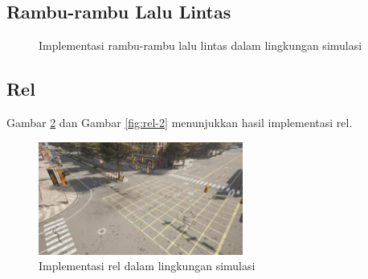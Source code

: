 \subsection{Rambu-rambu Lalu Lintas}

\begin{figure}[!h]
	\centering
	\hfill
	\caption{Implementasi rambu-rambu lalu lintas dalam lingkungan simulasi}
	\label{fig:road-signs}
\end{figure}

\subsection{Rel}

Gambar \ref{fig:rel} dan Gambar \ref{fig:rel-2} menunjukkan hasil implementasi rel.



\begin{figure}[!h]
    \centering
    \includegraphics[width=0.6\textwidth]{resources/chapter-4/rel.png}
    \caption{Implementasi rel dalam lingkungan simulasi}
    \label{fig:rel}
\end{figure}

